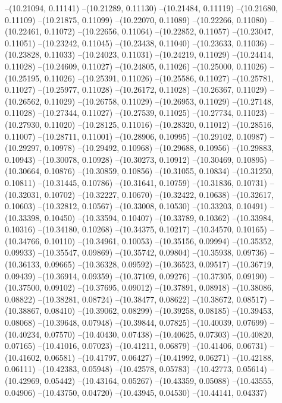 --(10.21094, 0.11141)
--(10.21289, 0.11130)
--(10.21484, 0.11119)
--(10.21680, 0.11109)
--(10.21875, 0.11099)
--(10.22070, 0.11089)
--(10.22266, 0.11080)
--(10.22461, 0.11072)
--(10.22656, 0.11064)
--(10.22852, 0.11057)
--(10.23047, 0.11051)
--(10.23242, 0.11045)
--(10.23438, 0.11040)
--(10.23633, 0.11036)
--(10.23828, 0.11033)
--(10.24023, 0.11031)
--(10.24219, 0.11029)
--(10.24414, 0.11028)
--(10.24609, 0.11027)
--(10.24805, 0.11026)
--(10.25000, 0.11026)
--(10.25195, 0.11026)
--(10.25391, 0.11026)
--(10.25586, 0.11027)
--(10.25781, 0.11027)
--(10.25977, 0.11028)
--(10.26172, 0.11028)
--(10.26367, 0.11029)
--(10.26562, 0.11029)
--(10.26758, 0.11029)
--(10.26953, 0.11029)
--(10.27148, 0.11028)
--(10.27344, 0.11027)
--(10.27539, 0.11025)
--(10.27734, 0.11023)
--(10.27930, 0.11020)
--(10.28125, 0.11016)
--(10.28320, 0.11012)
--(10.28516, 0.11007)
--(10.28711, 0.11001)
--(10.28906, 0.10995)
--(10.29102, 0.10987)
--(10.29297, 0.10978)
--(10.29492, 0.10968)
--(10.29688, 0.10956)
--(10.29883, 0.10943)
--(10.30078, 0.10928)
--(10.30273, 0.10912)
--(10.30469, 0.10895)
--(10.30664, 0.10876)
--(10.30859, 0.10856)
--(10.31055, 0.10834)
--(10.31250, 0.10811)
--(10.31445, 0.10786)
--(10.31641, 0.10759)
--(10.31836, 0.10731)
--(10.32031, 0.10702)
--(10.32227, 0.10670)
--(10.32422, 0.10638)
--(10.32617, 0.10603)
--(10.32812, 0.10567)
--(10.33008, 0.10530)
--(10.33203, 0.10491)
--(10.33398, 0.10450)
--(10.33594, 0.10407)
--(10.33789, 0.10362)
--(10.33984, 0.10316)
--(10.34180, 0.10268)
--(10.34375, 0.10217)
--(10.34570, 0.10165)
--(10.34766, 0.10110)
--(10.34961, 0.10053)
--(10.35156, 0.09994)
--(10.35352, 0.09933)
--(10.35547, 0.09869)
--(10.35742, 0.09804)
--(10.35938, 0.09736)
--(10.36133, 0.09665)
--(10.36328, 0.09592)
--(10.36523, 0.09517)
--(10.36719, 0.09439)
--(10.36914, 0.09359)
--(10.37109, 0.09276)
--(10.37305, 0.09190)
--(10.37500, 0.09102)
--(10.37695, 0.09012)
--(10.37891, 0.08918)
--(10.38086, 0.08822)
--(10.38281, 0.08724)
--(10.38477, 0.08622)
--(10.38672, 0.08517)
--(10.38867, 0.08410)
--(10.39062, 0.08299)
--(10.39258, 0.08185)
--(10.39453, 0.08068)
--(10.39648, 0.07948)
--(10.39844, 0.07825)
--(10.40039, 0.07699)
--(10.40234, 0.07570)
--(10.40430, 0.07438)
--(10.40625, 0.07303)
--(10.40820, 0.07165)
--(10.41016, 0.07023)
--(10.41211, 0.06879)
--(10.41406, 0.06731)
--(10.41602, 0.06581)
--(10.41797, 0.06427)
--(10.41992, 0.06271)
--(10.42188, 0.06111)
--(10.42383, 0.05948)
--(10.42578, 0.05783)
--(10.42773, 0.05614)
--(10.42969, 0.05442)
--(10.43164, 0.05267)
--(10.43359, 0.05088)
--(10.43555, 0.04906)
--(10.43750, 0.04720)
--(10.43945, 0.04530)
--(10.44141, 0.04337)
